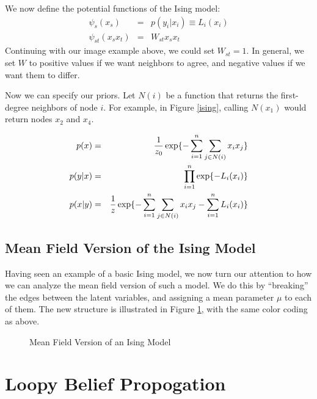 \documentclass[twoside]{article}
\begin{document}
We now define the potential functions of the Ising model:
\begin{eqnarray*}
\psi_s(x_s) &=& p(y_i | x_i) \equiv L_i(x_i) \\
\psi_{st} (x_s x_t) &=& W_{st} x_s x_t 
\end{eqnarray*} 
Continuing with our image example above, we could set $W_{st}=1$. In general, we set $W$ to positive values if we want neighbors to agree, and negative values if we want them to differ. 

Now we can specify our priors. Let $N(i)$ be a function that returns the first-degree neighbors of node $i$. For example, in Figure \ref{ising}, calling $N(x_1)$ would return nodes $x_2$ and $x_4$.

\begin{eqnarray*}
p(x) &=& {1 \over z_0} \exp\{ - \sum_{i=1}^n \sum_{j \in N(i)} x_i x_j \} \\
p(y|x) &=& \prod_{i=1}^n \exp \{-L_i(x_i) \} \\
p(x|y) &=& {1 \over z} \exp \{ - \sum_{i=1}^n  \sum_{j \in N(i)} x_i x_j - \sum_{i=1}^n L_i(x_i) \}
\end{eqnarray*}

\subsection{Mean Field Version of the Ising Model}

Having seen an example of a basic Ising model, we now turn our attention to how we can analyze the mean field version of such a model. We do this by ``breaking'' the edges between the latent variables, and assigning a mean parameter $\mu$ to each of them. The new structure is illustrated in Figure \ref{meanfield}, with the same color coding as above. 

\begin{figure}[h!]
\begin{center}
\end{center}
\caption{Mean Field Version of an Ising Model}
\label{meanfield}
\end{figure}

\section{Loopy Belief Propogation}
\end{document}

